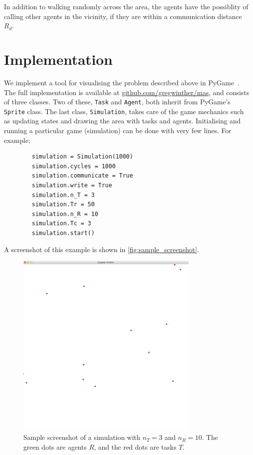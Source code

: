 \documentclass[11pt]{article}
\begin{document}
    In addition to walking randomly across the area, the agents have the 
    possiblity of calling other agents in the vicinity, if they are within 
    a communication distance $R_d$.

    \section{Implementation} 

    We implement a tool for visualising the problem described above in 
    PyGame~\cite{pygame}.
    The full implementation is available at \url{github.com/gregwinther/mas},
    and consists of three classes. Two of these, \lstinline!Task! and \lstinline!Agent!,
    both inherit from PyGame's \lstinline!Sprite! class. The last class,
    \lstinline!Simulation!, takes care of the game mechanics such as updating
    states and drawing the area with tasks and agents. Initialising and running 
    a particular game (simulation) can be done with very few lines. For example;
    \begin{lstlisting}
        simulation = Simulation(1000)
        simulation.cycles = 1000
        simulation.communicate = True
        simulation.write = True
        simulation.n_T = 3
        simulation.Tr = 50
        simulation.n_R = 10
        simulation.Tc = 3
        simulation.start()
    \end{lstlisting}
    A screenshot of this example is shown in \autoref{fig:sample_screenshot}.

    \begin{figure}
        \centering
        \includegraphics[width=0.8\textwidth]{figures/screenshot.png}
        \caption{
            Sample screenshot of a simulation with $n_T=3$ and $n_R=10$.
            The green dots are agents $R$, and the red 
            dots are tasks $T$. 
        }
        \label{fig:sample_screenshot}
    \end{figure}
\end{document}

